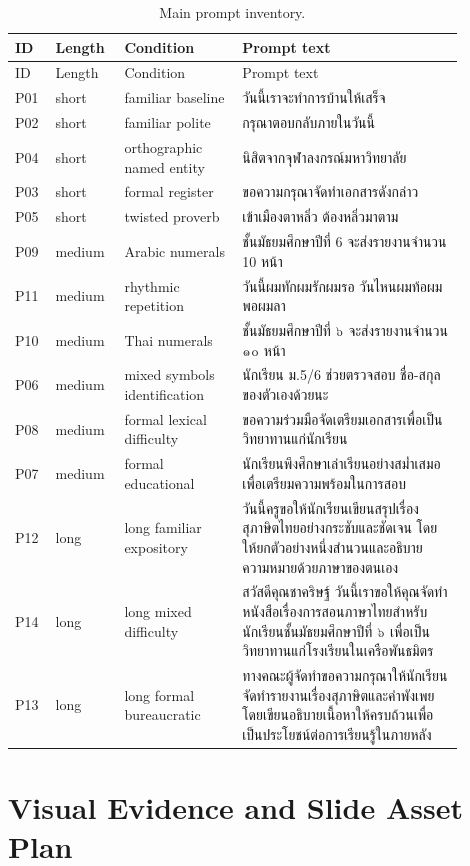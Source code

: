\documentclass[11pt,a4paper]{article}
\begin{document}
\begin{longtable}{p{0.07\linewidth} p{0.13\linewidth} p{0.24\linewidth} p{0.45\linewidth}}
\caption{Main prompt inventory.}
\label{tab:prompt_inventory}\\
\toprule
ID & Length & Condition & Prompt text \\
\midrule
\endfirsthead
\toprule
ID & Length & Condition & Prompt text \\
\midrule
\endhead
P01 & short & familiar baseline & วันนี้เราจะทำการบ้านให้เสร็จ \\
P02 & short & familiar polite & กรุณาตอบกลับภายในวันนี้ \\
P04 & short & orthographic named entity & นิสิตจากจุฬาลงกรณ์มหาวิทยาลัย \\
P03 & short & formal register & ขอความกรุณาจัดทำเอกสารดังกล่าว \\
P05 & short & twisted proverb & เข้าเมืองตาหลิ่ว ต้องหลิ่วมาตาม \\
P09 & medium & Arabic numerals & ชั้นมัธยมศึกษาปีที่ 6 จะส่งรายงานจำนวน 10 หน้า \\
P11 & medium & rhythmic repetition & วันนี้ผมทักผมรักผมรอ วันไหนผมท้อผมพอผมลา \\
P10 & medium & Thai numerals & ชั้นมัธยมศึกษาปีที่ ๖ จะส่งรายงานจำนวน ๑๐ หน้า \\
P06 & medium & mixed symbols identification & นักเรียน ม.5/6 ช่วยตรวจสอบ ชื่อ-สกุล ของตัวเองด้วยนะ \\
P08 & medium & formal lexical difficulty & ขอความร่วมมือจัดเตรียมเอกสารเพื่อเป็นวิทยาทานแก่นักเรียน \\
P07 & medium & formal educational & นักเรียนพึงศึกษาเล่าเรียนอย่างสม่ำเสมอเพื่อเตรียมความพร้อมในการสอบ \\
P12 & long & long familiar expository & วันนี้ครูขอให้นักเรียนเขียนสรุปเรื่องสุภาษิตไทยอย่างกระชับและชัดเจน โดยให้ยกตัวอย่างหนึ่งสำนวนและอธิบายความหมายด้วยภาษาของตนเอง \\
P14 & long & long mixed difficulty & สวัสดีคุณชาคริษฐ์ วันนี้เราขอให้คุณจัดทำหนังสือเรื่องการสอนภาษาไทยสำหรับนักเรียนชั้นมัธยมศึกษาปีที่ ๖ เพื่อเป็นวิทยาทานแก่โรงเรียนในเครือพันธมิตร \\
P13 & long & long formal bureaucratic & ทางคณะผู้จัดทำขอความกรุณาให้นักเรียนจัดทำรายงานเรื่องสุภาษิตและคำพังเพย โดยเขียนอธิบายเนื้อหาให้ครบถ้วนเพื่อเป็นประโยชน์ต่อการเรียนรู้ในภายหลัง \\
\bottomrule
\end{longtable}

\section{Visual Evidence and Slide Asset Plan}
\end{document}
